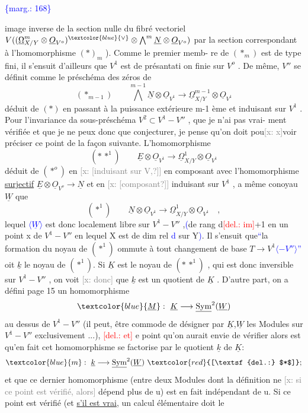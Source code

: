 \documentclass[11pt]{article}
\newcommand{\scanpage}[1]{\par\bigskip\noindent{\small\sffamily[scan #1]}\par}
\newcommand{\mspage}[1]{{\small\sffamily[p.\,#1]}}
\newcommand{\hand}[1]{\textcolor{blue}{#1}}
\let\over\relax
\newcommand{\over}[2]{\textcolor{gray}{#1}\textcolor{blue}{\ensuremath{^{\!\nearrow}}#2}}
\newcommand{\inserted}[2][]{\textcolor{blue}{$\langle$#2$\rangle$}}
\newcommand{\margin}[1]{\textcolor{blue}{\{\textsf{marg.:} #1\}}}
\newcommand{\deleted}[1]{\textcolor{red}{[\textsf{del.:} #1]}}
\newcommand{\xout}[1]{\textcolor{gray}{[\textsf{x:} #1]}}
\newcommand{\uline}[1]{\underline{#1}}
\newcommand{\unsure}[1]{[#1?]}
\begin{document}
\margin{168}

\clearpage
\scanpage{25/169}
\mspage{\hand{\unsure{4}}}

image inverse de la section nulle du fibré vectoriel $V((\underline{\Omega}^m_{X/Y}\otimes\underline{O}_{V^o})^{\hand{\vee}}\otimes\bigwedge^m\underline{N}\otimes\underline{O}_{V^o})$
par la section correspondant à l'homomorphisme $(*)_{m}$ ). Comme le premier memb-%
re de $(*_m)$ est de type fini, il s'ensuit d'ailleurs que $V^1$ est de présantati%
on finie sur $V^o$ . De même, $V''$ se définit comme le préschéma des zéros de
\[ (*_{m-1}) \qquad \bigwedge^{m-1}\underline{N}\otimes\underline{O}_{V^1} \longrightarrow \underline{\Omega}^{m-1}_{X/Y}\otimes\underline{O}_{V^1} \]
déduit de $(*)$ en passant à la puissance extérieure m-1 ème et induisant sur
$V^1$ . Pour l'invariance da sous-préschéma $V^2\subset V^1-V''$ , que je n'ai pas vrai-%
ment vérifiée et que je ne peux donc que conjecturer, je pense qu'on doit
pou\xout{x}voir préciser ce point de la façon suivante. L'homomorphisme
\[ (*\,*^1) \qquad \underline{E}\otimes\underline{O}_{V^1}\longrightarrow\underline{\Omega}^1_{X/Y}\otimes\underline{O}_{V^1} \]
déduit de $(*^o)$ en \xout{\unsure{induisant sur V,}} en composant avec l'homomorphisme
\uline{surjectif} $\underline{E}\otimes\underline{O}_{V^o}\to\underline{N}$ et en \xout{\unsure{composant}} induisant sur $V^1$ , a même conoyau
$\underline{W}$ que
\[ (*^1) \qquad \underline{N}\otimes\underline{O}_{V^1}\to\underline{\Omega}^1_{X/Y}\otimes\underline{O}_{V^1} \quad , \]
lequel \inserted{$\underline{W}$} est donc localement libre sur $V^1-V''$ ,\hand{(}de rang d\deleted{im}+1 en un point
x de $V^1-V''$ en lequel X est de dim rel \hand{d} sur Y\hand{)}. Il s'ensuit que\hand{``}la formation
du noyau de $(*^1)$ \over{c}{C}ommute à tout changement de base $T\to V^1$\inserted{$-V''$}\hand{''}\over{.}{,} \over{s}{S}oit $\underline{k}$ le
noyau de $(*^1)$. Si $\underline{K}$ est le noyau de $(*\,*^1)$ , qui est donc inversible sur
$V^1-V''$ , on voit \xout{donc} que $\underline{k}$ est un quotient de $\underline{K}$ . D'autre part, on a défini
page 15 un homomorphisme
\[ \hand{\underline{M}} : \ \underline{K}\longrightarrow\underline{\mathrm{Sym}}^2(\underline{W}) \]
au dessus de $V^1-V''$ (il peut, être commode de désigner par $\underline{K}$,$\underline{W}$ les Modules
sur $V^1-V''$ exclusivement ...), \deleted{et} \over{l}{L}e point qu'on aurait envie de vérifier
alors est qu'en fait cet homomorphisme se factorise par le quotient $\underline{k}$ de $\underline{K}$:
\[ \hand{m} : \ \underline{k}\longrightarrow\underline{\mathrm{Sym}}^2(\underline{W}) \ \deleted{$*$} ; \]
et que ce dernier homomorphisme (entre deux Modules dont la définition ne
\xout{si ce point est vérifié, alors} dépend plus de u) est en fait indépendant de
u. Si ce point est vérifié (et \uline{s'il est vrai}, un calcul élémentaire doit le
\end{document}
